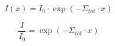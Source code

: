 \documentclass[../main.tex]{subfiles}%
\begin{document}
%
    \Xequation%
    \begin{equation*}%
        I(x) = I_{0} \cdot \exp{\left(-\Sigma_{tot} \cdot x \right)}%
    \end{equation*}%
    \par%
    \vspace*{-2.50ex}%
    \begin{equation}%
        \dfrac{I}{I_{0}} = \exp{\left(-\Sigma_{tot} \cdot x \right)}%
        \label{eq:neutron-attenuation}%
    \end{equation}%
\end{document}
